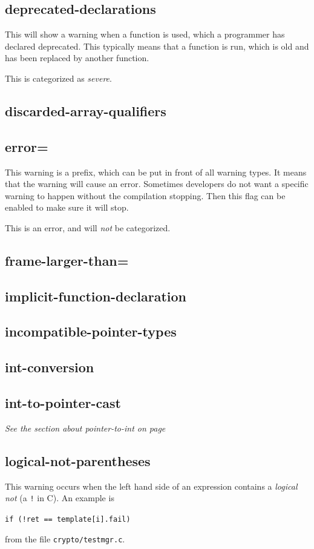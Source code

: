 \documentclass[a4paper,11pt]{report}
\newcommand{\textcode}[1]{
    \fboxsep=1pt
    \texttt{\colorbox{gray!20}{#1}}
}
\begin{document}
            \subsection*{deprecated-declarations}
This will show a warning when a function is used, which a programmer has 
declared deprecated. This typically means that a function is run, which is old
and has been replaced by another function.

This is categorized as \emph{severe}.


            \subsection*{discarded-array-qualifiers}
            \subsection*{error=}
This warning is a prefix, which can be put in front of all warning types. It 
means that the warning will cause an error. Sometimes developers do not want a 
specific warning to happen without the compilation stopping. Then this flag can 
be enabled to make sure it will stop.

This is an error, and will \emph{not} be categorized.

            \subsection*{frame-larger-than=}
            \subsection*{implicit-function-declaration}
            \subsection*{incompatible-pointer-types}
            \subsection*{int-conversion}
            \subsection*{int-to-pointer-cast}
\emph{See the section about pointer-to-int on page \pageref{par:pointertoint}}


            \subsection*{logical-not-parentheses}
This warning occurs when the left hand side of an expression contains a 
\emph{logical not} (a \texttt{!} in C). An example is 
    \textcode{if (!ret == template[i].fail)} 
from the file \texttt{crypto/testmgr.c}.
\end{document}
